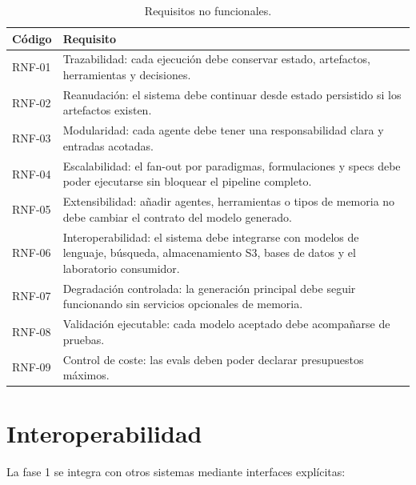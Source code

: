 \begin{table}[H]
\begin{center}
\small
\begin{tabular}{|p{1.6cm}|p{10.8cm}|} \hline
\textbf{Código} & \textbf{Requisito} \\ \hline
RNF-01 & Trazabilidad: cada ejecución debe conservar estado, artefactos, herramientas y decisiones. \\ \hline
RNF-02 & Reanudación: el sistema debe continuar desde estado persistido si los artefactos existen. \\ \hline
RNF-03 & Modularidad: cada agente debe tener una responsabilidad clara y entradas acotadas. \\ \hline
RNF-04 & Escalabilidad: el fan-out por paradigmas, formulaciones y specs debe poder ejecutarse sin bloquear el pipeline completo. \\ \hline
RNF-05 & Extensibilidad: añadir agentes, herramientas o tipos de memoria no debe cambiar el contrato del modelo generado. \\ \hline
RNF-06 & Interoperabilidad: el sistema debe integrarse con modelos de lenguaje, búsqueda, almacenamiento S3, bases de datos y el laboratorio consumidor. \\ \hline
RNF-07 & Degradación controlada: la generación principal debe seguir funcionando sin servicios opcionales de memoria. \\ \hline
RNF-08 & Validación ejecutable: cada modelo aceptado debe acompañarse de pruebas. \\ \hline
RNF-09 & Control de coste: las evals deben poder declarar presupuestos máximos. \\ \hline
\end{tabular}
\caption{Requisitos no funcionales.}
\end{center}
\end{table}

\section{Interoperabilidad}

La fase 1 se integra con otros sistemas mediante interfaces explícitas:

